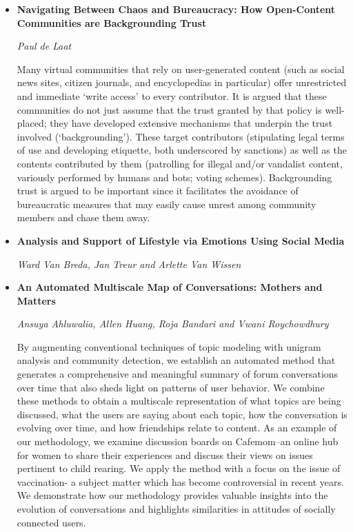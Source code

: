 \documentclass[a4paper,12pt,svgnames]{report}
\begin{document}
\begin{itemize}
\item \textbf{Navigating Between Chaos and Bureaucracy: How Open-Content
Communities are Backgrounding Trust}

\textit{Paul de Laat}

Many virtual communities that rely on user-generated content (such as social
news sites, citizen journals, and encyclopedias in particular) offer
unrestricted and immediate ‘write access’ to every contributor. It is argued
that these communities do not just assume that the trust granted by that policy
is well-placed; they have developed extensive mechanisms that underpin the trust
involved (‘backgrounding’). These target contributors (stipulating legal terms
of use and developing etiquette, both underscored by sanctions) as well as the
contents contributed by them (patrolling for illegal and/or vandalist content,
variously performed by humans and bots; voting schemes). Backgrounding trust is
argued to be important since it facilitates the avoidance of bureaucratic
measures that may easily cause unrest among community members and chase them
away.


\item \textbf{Analysis and Support of Lifestyle via Emotions Using Social Media}

\textit{Ward Van Breda, Jan Treur and Arlette Van Wissen}

\item \textbf{An Automated Multiscale Map of Conversations: Mothers and Matters}

\textit{Ansuya Ahluwalia, Allen Huang, Roja Bandari and Vwani Roychowdhury}

By augmenting conventional techniques of topic modeling with unigram analysis
and community detection, we establish an automated method that generates a
comprehensive and meaningful summary of forum conversations over time that also
sheds light on patterns of user behavior. We combine these methods to obtain a
multiscale representation of what topics are being discussed, what the users are
saying about each topic, how the conversation is evolving over time, and how
friendships relate to content. As an example of our methodology, we examine
discussion boards on Cafemom–an online hub for women to share their experiences
and discuss their views on issues pertinent to child rearing. We apply the
method with a focus on the issue of vaccination- a subject matter which has
become controversial in recent years. We demonstrate how our methodology
provides valuable insights into the evolution of conversations and highlights
similarities in attitudes of socially connected users.



\end{itemize}
\end{document}
